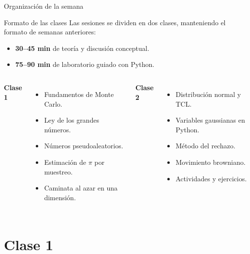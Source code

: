 





\frame{\titlepage}

\begin{frame}{Organización de la semana}
\small
\begin{block}{Formato de las clases}
Las sesiones se dividen en dos clases, manteniendo el formato de semanas anteriores:
\begin{itemize}
    \item \textbf{30--45 min} de teoría y discusión conceptual.
    \item \textbf{75--90 min} de laboratorio guiado con Python.
\end{itemize}
\end{block}

\vspace{0.15cm}
\begin{columns}[T,onlytextwidth]
\textbf{Clase 1}
\begin{itemize}
    \setlength\itemsep{0.2em}
    \item Fundamentos de Monte Carlo.
    \item Ley de los grandes números.
    \item Números pseudoaleatorios.
    \item Estimación de $\pi$ por muestreo.
    \item Caminata al azar en una dimensión.
\end{itemize}

\textbf{Clase 2}
\begin{itemize}
    \setlength\itemsep{0.2em}
    \item Distribución normal y TCL.
    \item Variables gaussianas en Python.
    \item Método del rechazo.
    \item Movimiento browniano.
    \item Actividades y ejercicios.
\end{itemize}
\end{columns}
\end{frame}

\section{Clase 1}

